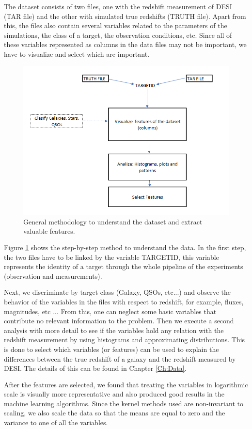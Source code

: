 The dataset consists of two files, one with the redshift measurement of DESI (TAR file) and the other with simulated true redshifts (TRUTH file). Apart from this, the files also contain several variables related to the parameters of the simulations, the class of a target, the observation conditions, etc. Since all of these variables represented as columns in the data files may not be important, we have to visualize and select which are important. 
\begin{figure}[h!]
	\centering
	\includegraphics[width=0.8\linewidth]{TeX_files/Imagenes/metho_1}
	\caption{General methodology to understand the dataset and extract valuable features.}
	\label{fig:metho1}
\end{figure}

Figure \ref{fig:metho1} shows the step-by-step method to understand the data. In the first step, the two files have to be linked by the variable TARGETID, this variable represents the identity of a target through the whole pipeline of the experiments (observation and measurements). 

Next, we discriminate by target class (Galaxy, QSOs, etc...) and observe the behavior of the variables in the files with respect to redshift, for example, fluxes, magnitudes, etc ... From this, one can neglect some basic variables that contribute no relevant information to the problem. Then we execute a second analysis with more detail to see if the variables hold any relation with the redshift measurement by using histograms and approximating distributions. This is done to select which variables (or features) can be used to explain the differences between the true redshift of a galaxy and the redshift measured by DESI. The details of this can be found in Chapter \ref{Ch:Data}. 

After the features are selected,  we found that treating the variables in logarithmic scale is visually more representative and also produced good results in the machine learning algorithms. Since the kernel methods used are non-invariant to scaling, we also scale the data so that the means are equal to zero and the variance to one of all the variables.
